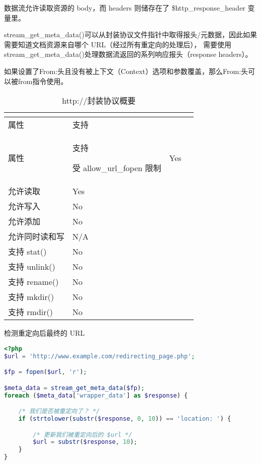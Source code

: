 数据流允许读取资源的 body，而 headers 则储存在了 \$http\_response\_header 变量里。

stream\_get\_meta\_data()可以从封装协议文件指针中取得报头/元数据，因此如果需要知道文档资源来自哪个 URL（经过所有重定向的处理后）， 需要使用stream\_get\_meta\_data()处理数据流返回的系列响应报头（response headers）。

如果设置了From:头且没有被上下文（Context）选项和参数覆盖，那么From:头可以被from指令使用。


\begin{longtable}{|m{150pt}|m{100pt}|}
\tabularnewline\hline
属性&支持
\endhead

\caption{http://封装协议概要}\\
\hline
属性&支持
\endfirsthead

\endfoot

\endlastfoot
\hline
受 allow\_url\_fopen 限制&Yes\\
\hline
允许读取	&Yes\\
\hline
允许写入	&No\\
\hline
允许添加	&No\\
\hline
允许同时读和写&N/A\\
\hline
支持 stat()	&No\\
\hline
支持 unlink()	&No\\
\hline
支持 rename()	&No\\
\hline
支持 mkdir()	&No\\
\hline
支持 rmdir()	&No\\
\hline
\end{longtable}

\begin{example}
检测重定向后最终的 URL
\begin{lstlisting}[language=PHP]
<?php
$url = 'http://www.example.com/redirecting_page.php';

$fp = fopen($url, 'r');

$meta_data = stream_get_meta_data($fp);
foreach ($meta_data['wrapper_data'] as $response) {

    /* 我们是否被重定向了？ */
    if (strtolower(substr($response, 0, 10)) == 'location: ') {

        /* 更新我们被重定向后的 $url */
        $url = substr($response, 10);
    }
}
\end{lstlisting}
\end{example}

\begin{lstlisting}[language=PHP]

\end{lstlisting}

